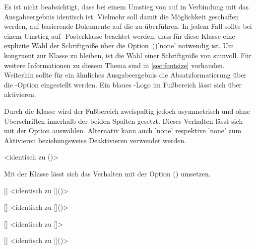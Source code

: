 \begin{DeclareEntity}{}
Es ist nicht beabsichtigt, dass bei einem Umstieg von  auf 
 in Verbindung mit  das Ausgabeergebnis 
identisch ist. Vielmehr soll damit die Möglichkeit geschaffen werden, auf 
 basierende Dokumente auf die  zu 
überführen. In jedem Fall sollte bei einem Umstieg auf \TUDScript-Posterklasse 
beachtet werden, dass für diese Klasse eine explizite Wahl der Schriftgröße 
über die Option~()'none' notwendig ist. 
Um kongruent zur Klasse  zu bleiben, ist die Wahl einer 
Schriftgröße von  sinnvoll. Für weitere 
Informationen zu diesem Thema sind in \autoref{sec:fontsize} vorhanden. 
Weiterhin sollte für ein ähnliches Ausgabeergebnis die Absatzformatierung über 
die \KOMAScript-Option  eingestellt werden. Ein blaues 
\DDC-Logo im Fußbereich lässt sich über  aktivieren.

\begin{Declaration}
  {}
\printdeclarationlist

Durch die Klasse  wird der Fußbereich zweispaltig jedoch 
asymmetrisch und ohne Überschriften innerhalb der beiden Spalten gesetzt. 
Dieses Verhalten lässt sich mit der Option  
auswählen. Alternativ kann auch 'none' respektive 
'none' zum Aktivieren beziehungsweise Deaktivieren 
verwendet werden.
\end{Declaration}

\begin{Declaration}
  {}
  <identisch zu ()>
\printdeclarationlist

Mit der Klasse  lässt sich das Verhalten mit der Option 
() umsetzen.
\end{Declaration}

\begin{Declaration}
  {[]}
<identisch zu []()>
\begin{Declaration}
  {[]}
  <identisch zu []()>
\begin{Declaration}
  {[]}
  <identisch zu []>
\begin{Declaration}
  {[]}
  <identisch zu []()>
\printdeclarationlist


\end{Declaration}
\end{Declaration}
\end{Declaration}
\end{Declaration}
\end{DeclareEntity}
